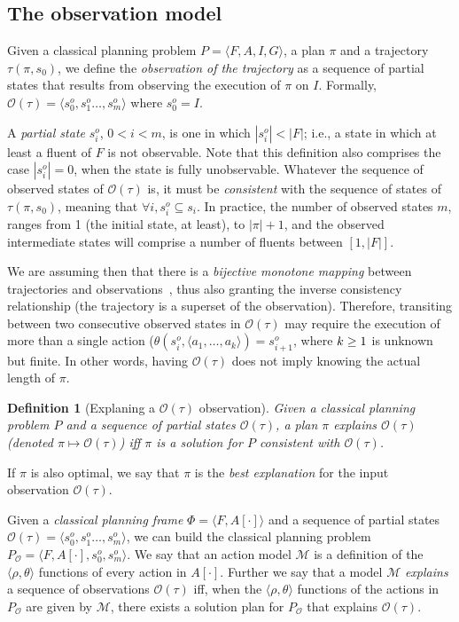 \documentclass{article}
\newcommand{\tup}[1]{{\langle #1 \rangle}}
\newtheorem{definition}[theorem]{Definition}
\begin{document}
\subsection{The observation model}
Given a classical planning problem $P=\tup{F,A,I,G}$, a plan $\pi$ and a trajectory $\tau(\pi,s_0)$, we define the \emph{observation of the trajectory} as a sequence of partial states that results from observing the execution of $\pi$ on $I$. Formally, $\mathcal{O}(\tau)=\tup{s_0^o,s_1^o \ldots , s_m^o}$ where $s_0^o=I$.

A {\em partial state} $s_i^o$, {\small $0<i<m$}, is one in which $|s_i^o| < |F|$; i.e., a state in which at least a fluent of $F$ is not observable. Note that this definition also comprises the case $|s_i^o| = 0$, when the state is fully unobservable. Whatever the sequence of observed states of $\mathcal{O}(\tau)$ is, it must be {\em consistent} with the sequence of states of $\tau(\pi,s_0)$, meaning that $\forall i, s_i^o \subseteq s_i$. In practice, the number of observed states $m$, ranges from 1 (the initial state, at least), to $|\pi|+1$, and the observed intermediate states will comprise a number of fluents between $[1,|F|]$.

\newpage

We are assuming then that there is a {\em bijective monotone mapping} between trajectories and observations~\cite{ramirez2009plan}, thus also granting the inverse consistency relationship (the trajectory is a superset of the observation). Therefore, transiting between two consecutive observed states in $\mathcal{O}(\tau)$ may require the execution of more than a single action ($\theta(s_i^o,\tup{a_1,\ldots,a_k})=s_{i+1}^o$, where ${\small k\geq 1}$ is unknown but finite. In other words, having $\mathcal{O}(\tau)$ does not imply knowing the actual length of $\pi$.

\begin{definition}[Explaning a $\mathcal{O}(\tau)$ observation]
Given a {\em classical planning problem} $P$ and a sequence of partial states $\mathcal{O}(\tau)$, a plan $\pi$ {\em explains} $\mathcal{O}(\tau)$ (denoted $\pi\mapsto\mathcal{O}(\tau)$) iff $\pi$ is a solution for $P$ {\em consistent} with $\mathcal{O}(\tau)$.  
\end{definition}
If $\pi$ is also optimal, we say that $\pi$ is the {\em best explanation} for the input observation $\mathcal{O}(\tau)$.

Given a {\em classical planning frame} $\Phi=\tup{F,A[\cdot]}$ and a sequence of partial states $\mathcal{O}(\tau)=\tup{s_0^o,s_1^o \ldots , s_m^o}$, we can build the classical planning problem $P_\mathcal{O}=\tup{F,A[\cdot],s_0^o,s_m^o}$. We say that an action model $\mathcal{M}$ is a definition of the $\tup{\rho,\theta}$ functions of every action in $A[\cdot]$. Further we say that a model $\mathcal{M}$ {\em explains} a sequence of observations $\mathcal{O}(\tau)$ iff, when the $\tup{\rho,\theta}$ functions of the actions in $P_\mathcal{O}$ are given by $\mathcal{M}$, there exists a solution plan for $P_\mathcal{O}$ that explains $\mathcal{O}(\tau)$.
\end{document}
